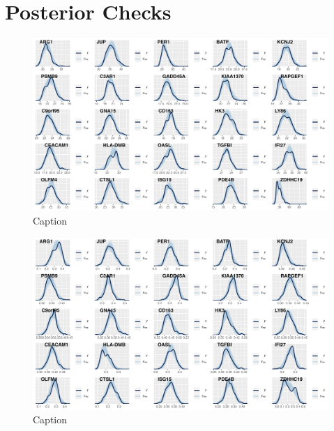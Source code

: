 \documentclass[../thesis.tex]{subfiles}
\begin{document}
\section{Posterior Checks}
\begin{figure}
    \centering
    \includegraphics[width=\textwidth]{figures/chapter2/clinical_single_target_offset_posteriors_fig.png}
    \caption{Caption}
    \label{fig:clinical_single_target_offset_posteriors_fig}
\end{figure}

\begin{figure}
    \centering
    \includegraphics[width=\textwidth]{figures/chapter2/clinical_single_target_rate_posteriors_fig.png}
    \caption{Caption}
    \label{fig:clinical_single_target_rate_posteriors_fig}
\end{figure}


\dobib %
 
\end{document}
